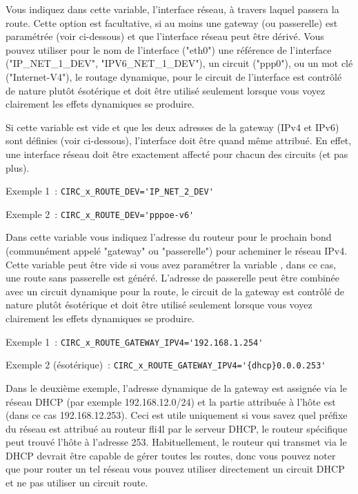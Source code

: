 \begin{description}


Vous indiquez dans cette variable, l'interface réseau, à travers laquel passera
la route. Cette option est facultative, si au moins une gateway (ou passerelle)
est paramétrée (voir ci-dessous) et que l'interface réseau peut être dérivé. Vous
pouvez utiliser pour le nom de l'interface ("eth0") une référence de l'interface
("IP\_NET\_1\_DEV", "IPV6\_NET\_1\_DEV"), un circuit ("ppp0"), ou un mot clé
("Internet-V4"), le routage dynamique, pour le circuit de l'interface est contrôlé de
nature plutôt ésotérique et doit être utilisé seulement lorsque vous voyez clairement
les effets dynamiques se produire.

Si cette variable est vide et que les deux adresses de la gateway (IPv4 et IPv6) sont
définies (voir ci-dessous), l'interface doit être quand même attribué. En effet, une interface
réseau doit être exactement affecté pour chacun des circuits (et pas plus).

Exemple 1~: \verb+CIRC_x_ROUTE_DEV='IP_NET_2_DEV'+

Exemple 2~: \verb+CIRC_x_ROUTE_DEV='pppoe-v6'+


Dans cette variable vous indiquez l'adresse du routeur pour le prochain bond (communément
appelé "gateway" ou "passerelle") pour acheminer le réseau IPv4. Cette variable peut être vide
si vous avez paramétrer la variable , dans ce cas, une route sans
passerelle est généré. L'adresse de passerelle peut être combinée avec un circuit dynamique pour
la route, le circuit de la gateway est contrôlé de nature plutôt ésotérique et doit être utilisé
seulement lorsque vous voyez clairement les effets dynamiques se produire.

Exemple 1~: \verb+CIRC_x_ROUTE_GATEWAY_IPV4='192.168.1.254'+

Exemple 2 (ésotérique)~: \verb+CIRC_x_ROUTE_GATEWAY_IPV4='{dhcp}0.0.0.253'+

Dans le deuxième exemple, l'adresse dynamique de la gateway est assignée via le réseau DHCP (par
exemple 192.168.12.0/24) et la partie attribuée à l'hôte est (dans ce cas 192.168.12.253). Ceci est
utile uniquement si vous savez quel préfixe du réseau est attribué au routeur fli4l par le serveur
DHCP, le routeur spécifique peut trouvé l'hôte à l'adresse 253. Habituellement, le routeur qui
transmet via le DHCP devrait être capable de gérer toutes les routes, donc vous pouvez noter
que pour router un tel réseau vous pouvez utiliser directement un circuit DHCP et ne pas utiliser
un circuit route.


\end{description}
